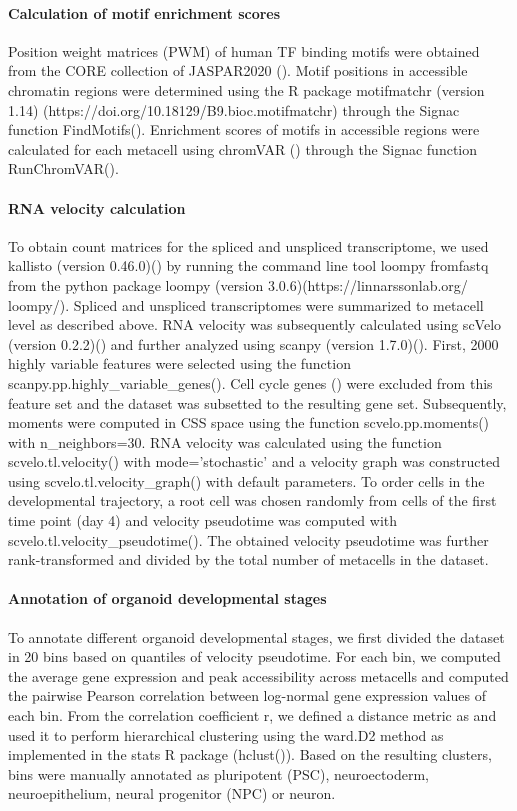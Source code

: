 \paragraph{Calculation of motif enrichment scores}
Position weight matrices (PWM) of human TF binding motifs were obtained from the CORE collection of JASPAR2020 (\cite{fornes_jaspar_2020}). Motif positions in accessible chromatin regions were determined using the R package motifmatchr (version 1.14) (https://doi.org/10.18129/B9.bioc.motifmatchr) through the Signac function FindMotifs(). Enrichment scores of motifs in accessible regions were calculated for each metacell using chromVAR (\cite{schep_chromvar_2017}) through the Signac function RunChromVAR().
 
\paragraph{RNA velocity calculation}
To obtain count matrices for the spliced and unspliced transcriptome, we used kallisto (version 0.46.0)(\cite{bray_near-optimal_2016}) by running the command line tool loompy fromfastq  from the python package loompy (version 3.0.6)(https://linnarssonlab.org/\\ loompy/). Spliced and unspliced transcriptomes were summarized to metacell level as described above. RNA velocity was subsequently calculated using scVelo (version 0.2.2)(\cite{bergen_generalizing_2020}) and further analyzed using scanpy (version 1.7.0)(\cite{wolf_scanpy_2018}). First, 2000 highly variable features were selected using the function scanpy.pp.highly\_variable\_genes(). Cell cycle genes (\cite{tirosh_dissecting_2016}) were excluded from this feature set and the dataset was subsetted to the resulting gene set. Subsequently, moments were computed in CSS space using the function scvelo.pp.moments() with n\_neighbors=30. RNA velocity was calculated using the function scvelo.tl.velocity() with mode=’stochastic’ and a velocity graph was constructed using scvelo.tl.velocity\_graph() with default parameters. To order cells in the developmental trajectory, a root cell was chosen randomly from cells of the first time point (day 4) and velocity pseudotime was computed with scvelo.tl.velocity\_pseudotime().  The obtained velocity pseudotime was further rank-transformed and divided by the total number of metacells in the dataset.
 
\paragraph{Annotation of organoid developmental stages}
To annotate different organoid developmental stages, we first divided the dataset in 20 bins based on quantiles of velocity pseudotime. For each bin, we computed the average gene expression and peak accessibility across metacells and computed the pairwise Pearson correlation between log-normal gene expression values of each bin. From the correlation coefficient r, we defined a distance metric as  and used it to perform hierarchical clustering using the ward.D2 method as implemented in the stats R package (hclust()). Based on the resulting clusters, bins were manually annotated as pluripotent (PSC), neuroectoderm, neuroepithelium, neural progenitor (NPC) or neuron.
 
